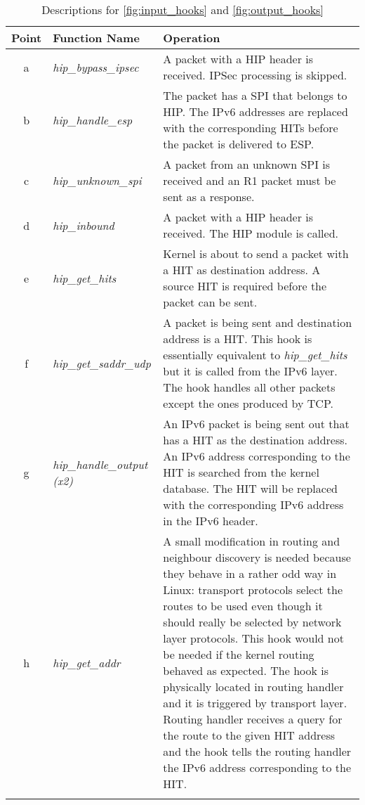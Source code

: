 \setlongtables
\begin{longtable}{|c|p{}|p{}|}
\\\hline
\endhead
\endfoot
Point & Function Name & Operation \\\hline

a & \textit{hip\_bypass\_ipsec} &

A packet with a HIP header is received. IPSec processing is skipped. \\

b & \textit{hip\_handle\_esp} &

The packet has a SPI that belongs to HIP. The IPv6 addresses are
replaced with the corresponding HITs before the packet is delivered to
ESP. \\

c & \textit{hip\_unknown\_spi} &

A packet from an unknown SPI is received and an R1 packet must be sent
as a response.\\

d & \textit{hip\_inbound} &

A packet with a HIP header is received. The HIP module is called.\\

e & \textit{hip\_get\_hits} &

Kernel is about to send a packet with a HIT as destination address. A
source HIT is required before the packet can be sent.\\

f & \textit{hip\_get\_saddr\_udp} &

A packet is being sent and destination address is a HIT. This hook is
essentially equivalent to \textit{hip\_get\_hits} but it is called
from the IPv6 layer. The hook handles all other packets except the
ones produced by TCP.\\

g & \textit{hip\_handle\_output (x2)} &

An IPv6 packet is being sent out that has a HIT as the destination
address. An IPv6 address corresponding to the HIT is searched from the
kernel database. The HIT will be replaced with the corresponding IPv6
address in the IPv6 header. \\

h & \textit{hip\_get\_addr} &
  
A small modification in routing and neighbour discovery is needed
because they behave in a rather odd way in Linux: transport protocols
select the routes to be used even though it should really be selected
by network layer protocols. This hook would not be needed if the
kernel routing behaved as expected. The hook is physically located in
routing handler and it is triggered by transport layer. Routing
handler receives a query for the route to the given HIT address and the
hook tells the routing handler the IPv6 address corresponding to the
HIT.\\

\hline
\caption{Descriptions for \autoref{fig:input_hooks} and
\autoref{fig:output_hooks}}
\label{tbl:hook_descriptions}
\end{longtable}

